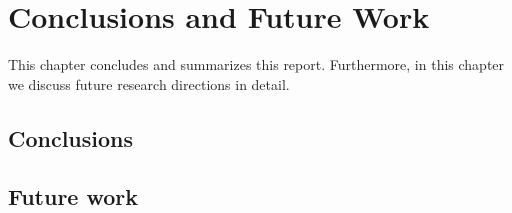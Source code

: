 \chapter{Conclusions and Future Work}
\label{ch7_conclusion}
This chapter concludes and summarizes this report.
Furthermore, in this chapter we discuss future research directions in detail.

\section{Conclusions}

\section{Future work}

